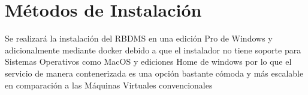 \section{Métodos de Instalación}

Se realizará la instalación del RBDMS en una edición Pro de Windows y adicionalmente mediante docker debido a que el instalador no tiene soporte para Sistemas Operativos como MacOS y ediciones Home de windows por lo que el servicio de manera contenerizada es una opción bastante cómoda y más escalable en comparación a las Máquinas Virtuales convencionales